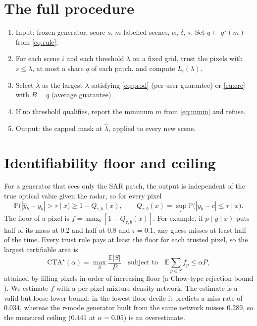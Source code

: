 \documentclass[11pt,a4paper]{article}
\theoremstyle{definition}
\theoremstyle{remark}
\newcommand{\E}{\mathbb{E}}
\newcommand{\Prob}{\mathbb{P}}
\newcommand{\1}{\mathbf{1}}
\begin{document}
\section{The full procedure}

\begin{enumerate}[label=\arabic*.,leftmargin=*]
\item Input: frozen generator, score $s$, $m$ labelled scenes, $\alpha$, $\delta$, $\tau$. Set $q\leftarrow q^\star(m)$ from \eqref{eq:rule}.
\item For each scene $i$ and each threshold $\lambda$ on a fixed grid, trust the pixels with $s\le\lambda$, at most a share $q$ of each patch, and compute $L_i(\lambda)$.
\item Select $\hat\lambda$ as the largest $\lambda$ satisfying \eqref{eq:prod} (per-user guarantee) or \eqref{eq:crc} with $B=q$ (average guarantee).
\item If no threshold qualifies, report the minimum $m$ from \eqref{eq:mmin} and refuse.
\item Output: the capped mask at $\hat\lambda$, applied to every new scene.
\end{enumerate}

\section{Identifiability floor and ceiling}

For a generator that sees only the SAR patch, the output is independent of the true optical value given the radar, so for every pixel
\begin{equation}
\Prob\bigl(|\hat y_b-y_b|>\tau\mid x\bigr)\ge1-Q_{\tau,b}(x),\qquad
Q_{\tau,b}(x)=\sup_c\Prob\bigl(|y_b-c|\le\tau\mid x\bigr).
\end{equation}
The floor of a pixel is $f=\max_b[1-Q_{\tau,b}(x)]$. For example, if $p(y\mid x)$ puts half of its mass at 0.2 and half at 0.8 and $\tau=0.1$, any guess misses at least half of the time. Every trust rule pays at least the floor for each trusted pixel, so the largest certifiable area is
\begin{equation}
\mathrm{CTA}^\star(\alpha)=\max_S\frac{\E|S|}{P}\quad\text{subject to}\quad\E\sum_{p\in S}f_p\le\alpha P,
\end{equation}
attained by filling pixels in order of increasing floor (a Chow-type rejection bound \cite{chow}). We estimate $f$ with a per-pixel mixture density network. The estimate is a valid but loose lower bound: in the lowest floor decile it predicts a miss rate of 0.034, whereas the $\tau$-mode generator built from the same network misses 0.289, so the measured ceiling (0.441 at $\alpha=0.05$) is an overestimate.
\end{document}
